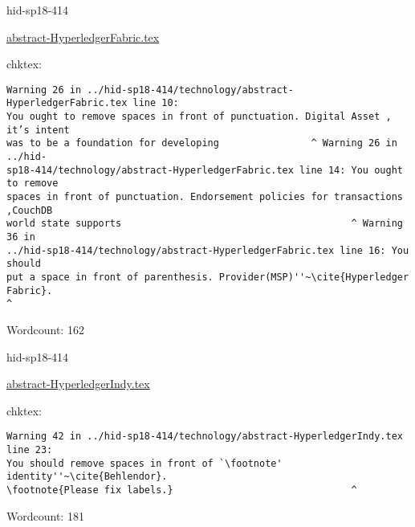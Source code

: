 

\begin{IU}

hid-sp18-414

\href{https://github.com/cloudmesh-community/hid-sp18-414/blob/master//technology/abstract-HyperledgerFabric.tex}{abstract-HyperledgerFabric.tex}

 
chktex:
\begin{tiny}
\begin{verbatim}
Warning 26 in ../hid-sp18-414/technology/abstract-HyperledgerFabric.tex line 10:
You ought to remove spaces in front of punctuation. Digital Asset , it’s intent
was to be a foundation for developing                ^ Warning 26 in ../hid-
sp18-414/technology/abstract-HyperledgerFabric.tex line 14: You ought to remove
spaces in front of punctuation. Endorsement policies for transactions ,CouchDB
world state supports                                        ^ Warning 36 in
../hid-sp18-414/technology/abstract-HyperledgerFabric.tex line 16: You should
put a space in front of parenthesis. Provider(MSP)''~\cite{Hyperledger Fabric}.
^
\end{verbatim}
\end{tiny}

Wordcount: 162

\end{IU}



\begin{IU}

hid-sp18-414

\href{https://github.com/cloudmesh-community/hid-sp18-414/blob/master//technology/abstract-HyperledgerIndy.tex}{abstract-HyperledgerIndy.tex}

 
chktex:
\begin{tiny}
\begin{verbatim}
Warning 42 in ../hid-sp18-414/technology/abstract-HyperledgerIndy.tex line 23:
You should remove spaces in front of `\footnote' identity''~\cite{Behlendor}.
\footnote{Please fix labels.}                               ^
\end{verbatim}
\end{tiny}

Wordcount: 181

\end{IU}



